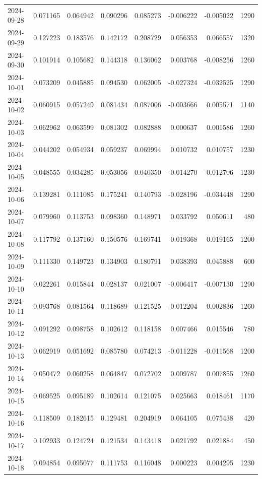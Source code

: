 \begin{tabular}{lrrrrrrr}
2024-09-28 & 0.071165 & 0.064942 & 0.090296 & 0.085273 & -0.006222 & -0.005022 & 1290 \\
2024-09-29 & 0.127223 & 0.183576 & 0.142172 & 0.208729 & 0.056353 & 0.066557 & 1320 \\
2024-09-30 & 0.101914 & 0.105682 & 0.144318 & 0.136062 & 0.003768 & -0.008256 & 1260 \\
2024-10-01 & 0.073209 & 0.045885 & 0.094530 & 0.062005 & -0.027324 & -0.032525 & 1290 \\
2024-10-02 & 0.060915 & 0.057249 & 0.081434 & 0.087006 & -0.003666 & 0.005571 & 1140 \\
2024-10-03 & 0.062962 & 0.063599 & 0.081302 & 0.082888 & 0.000637 & 0.001586 & 1260 \\
2024-10-04 & 0.044202 & 0.054934 & 0.059237 & 0.069994 & 0.010732 & 0.010757 & 1230 \\
2024-10-05 & 0.048555 & 0.034285 & 0.053056 & 0.040350 & -0.014270 & -0.012706 & 1230 \\
2024-10-06 & 0.139281 & 0.111085 & 0.175241 & 0.140793 & -0.028196 & -0.034448 & 1290 \\
2024-10-07 & 0.079960 & 0.113753 & 0.098360 & 0.148971 & 0.033792 & 0.050611 & 480 \\
2024-10-08 & 0.117792 & 0.137160 & 0.150576 & 0.169741 & 0.019368 & 0.019165 & 1200 \\
2024-10-09 & 0.111330 & 0.149723 & 0.134903 & 0.180791 & 0.038393 & 0.045888 & 600 \\
2024-10-10 & 0.022261 & 0.015844 & 0.028137 & 0.021007 & -0.006417 & -0.007130 & 1290 \\
2024-10-11 & 0.093768 & 0.081564 & 0.118689 & 0.121525 & -0.012204 & 0.002836 & 1260 \\
2024-10-12 & 0.091292 & 0.098758 & 0.102612 & 0.118158 & 0.007466 & 0.015546 & 780 \\
2024-10-13 & 0.062919 & 0.051692 & 0.085780 & 0.074213 & -0.011228 & -0.011568 & 1200 \\
2024-10-14 & 0.050472 & 0.060258 & 0.064847 & 0.072702 & 0.009787 & 0.007855 & 1260 \\
2024-10-15 & 0.069525 & 0.095189 & 0.102614 & 0.121075 & 0.025663 & 0.018461 & 1170 \\
2024-10-16 & 0.118509 & 0.182615 & 0.129481 & 0.204919 & 0.064105 & 0.075438 & 420 \\
2024-10-17 & 0.102933 & 0.124724 & 0.121534 & 0.143418 & 0.021792 & 0.021884 & 450 \\
2024-10-18 & 0.094854 & 0.095077 & 0.111753 & 0.116048 & 0.000223 & 0.004295 & 1230 \\

\end{tabular}
